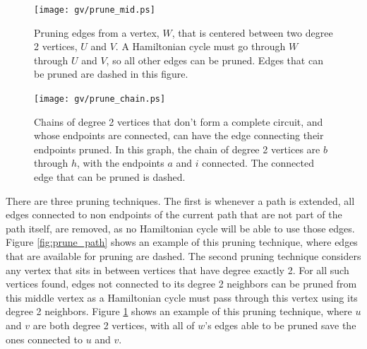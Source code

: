 \documentclass[twoside,11pt]{article}
\begin{document}
\begin{figure}
\centering
\texttt{[image: gv/prune\_mid.ps]}
\caption{ Pruning edges from a vertex, $W$, that is centered between two degree 2 vertices, $U$ and $V$.  A Hamiltonian cycle
must go through $W$ through $U$ and $V$, so all other edges can be pruned.  Edges that can be pruned are dashed in this figure.  }
\label{fig:prune_mid}
\end{figure}

\begin{figure}
\centering
\texttt{[image: gv/prune\_chain.ps]}
\caption{ Chains of degree 2 vertices that don't form a complete circuit, and whose endpoints are connected, can have the edge connecting their endpoints pruned.  In this graph, the chain
of degree 2 vertices are $b$ through $h$, with the endpoints $a$ and $i$ connected.  The connected edge that can be pruned is dashed.  }
\label{fig:prune_chain}
\end{figure}


There are three pruning techniques.  The first is
whenever a path is extended, all edges connected to non endpoints of the current path that are not part of the path itself, are removed,
as no Hamiltonian cycle will be able to use those edges.  Figure \ref{fig:prune_path} shows
an example of this pruning technique, where edges that are available for pruning are dashed.  The second
pruning technique considers any vertex that sits in between vertices that have degree exactly 2.  For all such vertices
found, edges not connected to its degree 2 neighbors can be pruned from this middle vertex as a Hamiltonian cycle must
pass through this vertex using its degree 2 neighbors.  Figure \ref{fig:prune_mid} shows an example of this pruning technique, where
$u$ and $v$ are both degree 2 vertices, with all of $w$'s edges able to be pruned save the ones connected to $u$ and $v$.
\end{document}
